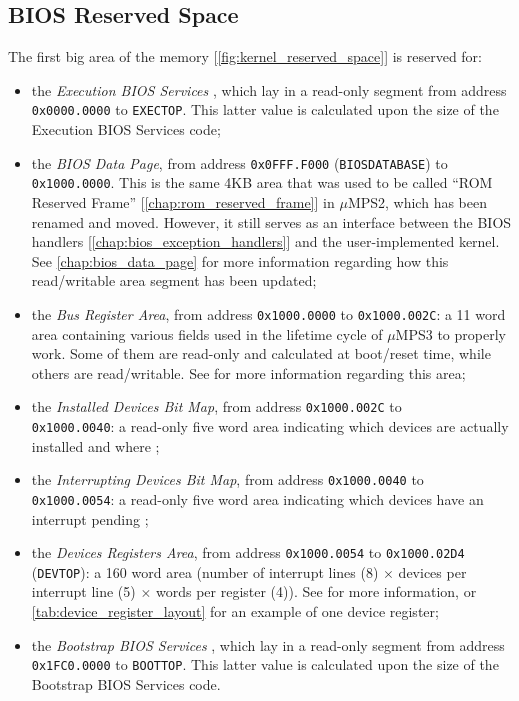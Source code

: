 \documentclass[12pt,a4paper,openright,twoside]{report}
\begin{document}
\subsection{BIOS Reserved Space}
\label{chap:bios_reserved_space}
The first big area of the memory [\autoref{fig:kernel_reserved_space}] is reserved for:
\begin{itemize}
	\item the \textit{Execution BIOS Services} \cite{pops}, which lay in a read-only segment from address \texttt{0x0000.0000} to \texttt{EXECTOP}.
	      This latter value is calculated upon the size of the Execution BIOS Services code;
	\item the \textit{BIOS Data Page}, from address \texttt{0x0FFF.F000} (\texttt{BIOSDATABASE}) to \texttt{0x1000.0000}.
	      This is the same 4KB area that was used to be called ``ROM Reserved Frame'' [\autoref{chap:rom_reserved_frame}] in $\mu$MPS2, which has been renamed and moved.
	      However, it still serves as an interface between the BIOS handlers [\autoref{chap:bios_exception_handlers}] and the user-implemented kernel.
	      See \autoref{chap:bios_data_page} for more information regarding how this read/writable area segment has been updated;
	\item the \textit{Bus Register Area}, from address \texttt{0x1000.0000} to \texttt{0x1000.002C}: a 11 word area containing various fields used in the lifetime cycle of $\mu$MPS3 to properly work.
	      Some of them are read-only and calculated at boot/reset time, while others are read/writable.
	      See \cite{pops} for more information regarding this area;
	\item the \textit{Installed Devices Bit Map}, from address \texttt{0x1000.002C} to \\ \texttt{0x1000.0040}: a read-only five word area indicating which devices are actually installed and where \cite{pops};
	\item the \textit{Interrupting Devices Bit Map}, from address \texttt{0x1000.0040} to \\ \texttt{0x1000.0054}: a read-only five word area indicating which devices have an interrupt pending \cite{pops};
	\item the \textit{Devices Registers Area}, from address \texttt{0x1000.0054} to \texttt{0x1000.02D4} (\texttt{DEVTOP}): a 160 word area (number of interrupt lines (8) $\times$ devices per interrupt line (5) $\times$  words per register (4)).
	      See \cite{pops} for more information, or \autoref{tab:device_register_layout} for an example of one device register;
	\item the \textit{Bootstrap BIOS Services} \cite{pops}, which lay in a read-only segment from address \texttt{0x1FC0.0000} to \texttt{BOOTTOP}.
	      This latter value is calculated upon the size of the Bootstrap BIOS Services code.
\end{itemize}
\end{document}
